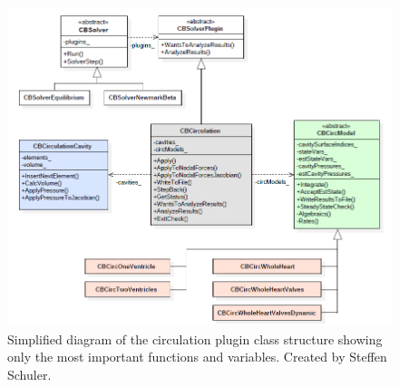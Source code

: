 \begin{figure}
    \centering
    \includegraphics[width=1\linewidth]{Graphics/Circulation_UML.PNG}
    \caption{Simplified diagram of the circulation plugin class structure showing only the most important functions and variables. Created by Steffen Schuler.}
    \label{fig:CircUML}
\end{figure}

